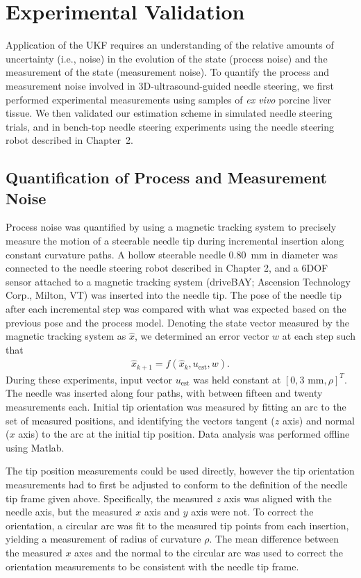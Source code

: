 \section{Experimental Validation}
\label{sec:AutonomousControl}
Application of the UKF requires an understanding of the relative amounts of uncertainty (i.e., noise) in the evolution of the state (process noise) and the measurement of the state (measurement noise). To quantify the process and measurement noise involved in 3D-ultrasound-guided needle steering, we first performed experimental measurements using samples of \textit{ex vivo} porcine liver tissue. We then validated our estimation scheme in simulated needle steering trials, and in bench-top needle steering experiments using the needle steering robot described in Chapter~2.

\subsection{Quantification of Process and Measurement Noise}
Process noise was quantified by using a magnetic tracking system to precisely measure the motion of a steerable needle tip during incremental insertion along constant curvature paths. A hollow steerable needle 0.80~mm in diameter was connected to the needle steering robot described in Chapter 2, and a 6DOF sensor attached to a magnetic tracking system (driveBAY; Ascension Technology Corp., Milton, VT) was inserted into the needle tip. The pose of the needle tip after each incremental step was compared with what was expected based on the previous pose and the process model. Denoting the state vector measured by the magnetic tracking system as $\hat{{x}}$, we determined an error vector ${w}$ at each step such that
\begin{align}
{\hat{x}_{k+1}} = f({\hat{x}_{k}}, {u_{\text{est}}}, {w}).
\end{align}
During these experiments, input vector ${u_{\text{est}}}$ was held constant at $[0, \text{3 mm}, \rho]^{T}$. The needle was inserted along four paths, with between fifteen and twenty measurements each. Initial tip orientation was measured by fitting an arc to the set of measured positions, and identifying the vectors tangent ($z$ axis) and normal ($x$ axis) to the arc at the initial tip position. Data analysis was performed offline using Matlab. 

The tip position measurements could be used directly, however the tip orientation measurements had to first be adjusted to conform to the definition of the needle tip frame given above. Specifically, the measured $z$ axis was aligned with the needle axis, but the measured $x$ axis and $y$ axis were not. To correct the orientation, a circular arc was fit to the measured tip points from each insertion, yielding a measurement of radius of curvature $\rho$. The mean difference between the measured $x$ axes and the normal to the circular arc was used to correct the orientation measurements to be consistent with the needle tip frame.

